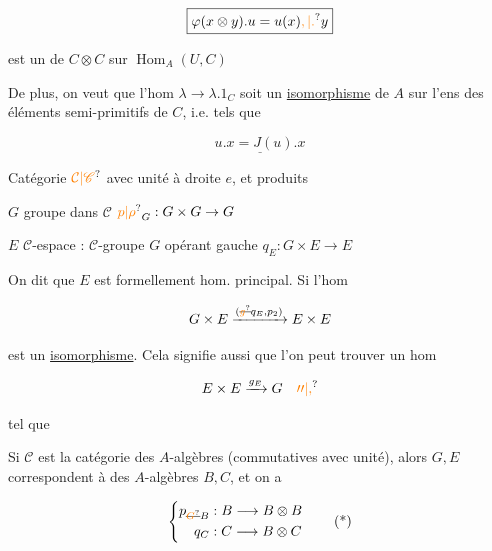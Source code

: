 \[
\boxed{\varphi(x\otimes y).u=u(x)\unsure{,|.}y}
\]

\makebox[0pt][r]{\smash{\raisebox{-2.3\baselineskip}{\(\left.\vphantom{\rule{0pt}{5\baselineskip}}\right]\)}}\hspace{.65em}}est un  de $C\otimes C$ sur $\operatorname{Hom}_A(U,C)$

De plus, on veut que l'hom $\lambda\to\lambda.1_C$ soit un \uline{isomorphisme} de $A$ sur l'ens des éléments semi-primitifs de $C$, i.e. tels que

\[
\underline{u.x=J(u).x}
\]


Catégorie $\unsure{\mathcal{C}|\mathscr{C}}$ avec unité à droite $e$, et produits

$G$ groupe dans $\mathcal{C}$ \qquad $\unsure{p|\rho}_G:G\times G\to G$

$E$ $\mathcal{C}$-espace : $\mathcal{C}$-groupe $G$ opérant  gauche \qquad $q_E:G\times E\to E$

On dit que $E$ est formellement hom. principal. Si l'hom

\[
G\times E\xrightarrow{(\deleted{\unsure{g}}q_E,p_2)}E\times E
\]



est un \uline{isomorphisme}. Cela signifie aussi que l'on peut trouver un hom

\[
E\times E\xrightarrow{g_E}G\quad\unsure{\prime\prime|,}
\]

tel que



Si $\mathcal{C}$ est la catégorie des $A$-algèbres (commutatives avec unité), alors $G,E$ correspondent à des $A$-algèbres  $B,C$, et on a

\[
\left\{\begin{aligned}
p_{\deleted{\unsure{G}}B}&:B\longrightarrow B\otimes B\\
q_C&:C\longrightarrow B\otimes C
\end{aligned}\right.\tag*{(*)}
\]

